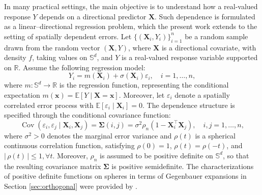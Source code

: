 \documentclass[12pt]{report} %
\newcommand{\bX}{\mathbf{X}}
\newcommand{\bx}{\mathbf{x}}
\newcommand{\bSigma}{\boldsymbol\Sigma}
\newcommand{\Sd}{\mathbb{S}^{d}}
\newcommand{\lc}{\left[}
\newcommand{\rc}{\right]}
\newcommand{\V}[1]{\mathbb{V}\mathrm{ar}\lc #1\rc}
\begin{document}
In many practical settings, the main objective is to understand how a real-valued response $Y$ depends on a directional predictor $\bX$. Such dependence is formulated as a linear--directional regression problem, which the present work extends to the setting of spatially dependent errors. Let $\{(\bX_i, Y_i)\}_{i=1}^n$ be a random sample drawn from the random vector $(\bX, Y)$, where $\bX$ is a directional covariate, with density $f$, taking values on $\Sd$, and $Y$ is a real-valued response variable supported on $\mathbb{R}$. Assume the following regression model:
\begin{equation}
\label{eq:reg-linear-spherical}
Y_i = m(\bX_i) + \sigma(\bX_i)\varepsilon_i, \quad i = 1, \dots, n,
\end{equation}
where $m: \mathbb{S}^d \to \mathbb{R}$ is the regression function, representing the conditional expectation $m(\bx) = \mathbb{E}[Y \mid \bX = \bx]$. Moreover, let $\varepsilon_i$ denote a spatially correlated error process with $\mathbb{E}\left[\varepsilon_i\mid \bX_i\right]=0$. The dependence structure is specified through the conditional covariance function:
$$
\operatorname{Cov}\left(\varepsilon_i, \varepsilon_j\mid \bX_i, \bX_j\right)=\bSigma(i, j)=\sigma^2 \rho_n(1-\bX_i^\top \bX_j), \quad i, j=1, \ldots, n,
$$
where $\sigma^2>0$ denotes the marginal error variance and $\rho(t)$ is a spherical continuous correlation function, satisfying $\rho(0)=1$, $\rho(t)=\rho(-t)$, and $\left|\,\rho(t) \, \right| \leq 1, \forall t$.  Moreover, $\rho_n$ is assumed to be positive definite on $\Sd$, so that the resulting covariance matrix $\bSigma$ is positive semidefinite. The characterizations of positive definite functions on spheres in terms of Gegenbauer expansions in Section \ref{sec:orthogonal} were provided by \citep{Gneiting2013}. 


\end{document}
